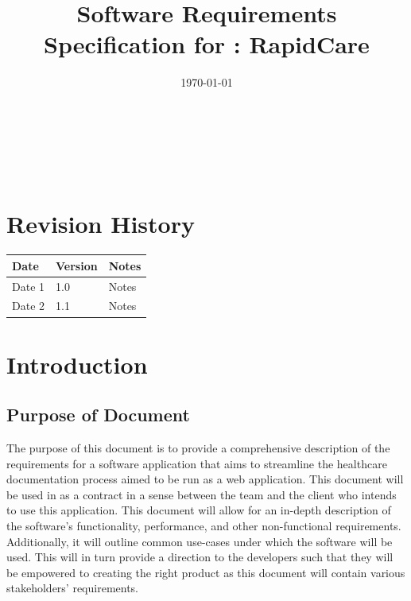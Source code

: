 \documentclass[12pt]{article}
\begin{document}
\title{Software Requirements Specification for \progname: RapidCare}
\author{\authname}
\date{\today}
	
\maketitle

~\newpage


\tableofcontents

~\newpage

\section*{Revision History}

\begin{tabularx}{\textwidth}{p{3cm}p{2cm}X}
\toprule {\bf Date} & {\bf Version} & {\bf Notes}\\
\midrule
Date 1 & 1.0 & Notes\\
Date 2 & 1.1 & Notes\\
\bottomrule
\end{tabularx}

\newpage



\section{Introduction}

\subsection{Purpose of Document} \label{sec_PurposeOfDocument}

  The purpose of this document is to provide a comprehensive description of the requirements for a software application that aims to streamline the healthcare documentation process aimed to be run as a web application. This document will be used in as a contract in a sense between the team and the client who intends to use this application. This document will allow for an in-depth description of the software's functionality, performance, and other non-functional requirements. Additionally, it will outline common use-cases under which the software will be used. This will in turn provide a direction to the developers such that they will be empowered to creating the right product as this document will contain various stakeholders' requirements.\\
\end{document}
